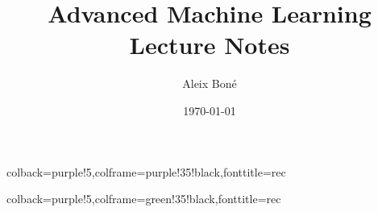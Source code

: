 %
{colback=purple!5,colframe=purple!35!black,fonttitle=\bfseries}{rec}

%
{colback=purple!5,colframe=green!35!black,fonttitle=\bfseries}{rec}


\renewcommand\and{\\[\baselineskip]}

\title{\Huge Advanced Machine Learning\\ \Large Lecture Notes}
\author{Aleix Boné}
\date{\today}








\tableofcontents \pagebreak

\listoffigures \listoftables \clearpage



\setlength{\parskip}{1em plus 0.5em minus 0.2em}






\nocite{*}

\printbibliography


